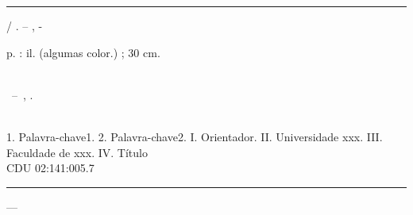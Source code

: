 \documentclass[
	12pt,				%
	openright,			%
	oneside,			%
	a4paper,			%
	english,			%
	brazil				%
	]{dissertacao-ufrgs-abntex2}
\begin{document}
\begin{fichacatalografica}
	\vspace*{\fill}					%
	\hrule							%
	\begin{center}					%
	\begin{minipage}[c]{12.5cm}		%

	\imprimirautor

	\hspace{0.5cm} \imprimirtitulo  / \imprimirautor. --
	\imprimirlocal, \imprimirdata-

	\hspace{0.5cm} \pageref{LastPage} p. : il. (algumas color.) ; 30 cm.\\

	\hspace{0.5cm} \imprimirorientadorRotulo~\imprimirorientador\\

	\hspace{0.5cm}
	\parbox[t]{\textwidth}{\imprimirtipotrabalho~--~\imprimirinstituicao,
	\imprimirdata.}\\

	\hspace{0.5cm}
		1. Palavra-chave1.
		2. Palavra-chave2.
		I. Orientador.
		II. Universidade xxx.
		III. Faculdade de xxx.
		IV. Título\\ 			

	\hspace{8.75cm} CDU 02:141:005.7\\

	\end{minipage}
	\end{center}
	\hrule
\end{fichacatalografica}
 ---
%
% 
%
\end{document}
